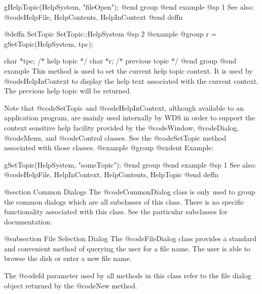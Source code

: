 gHelpTopic(HelpSystem, "fileOpen");
@end group
@end example
@sp 1
See also:  @code{HelpFile, HelpContents, HelpInContext}
@end deffn














@deffn {SetTopic} SetTopic::HelpSystem
@sp 2
@example
@group
r = gSetTopic(HelpSystem, tpc);

char    *tpc;   /*  help topic      */
char    *r;     /*  previous topic  */
@end group
@end example
This method is used to set the current help topic context.  It is
used by @code{HelpInContext} to display the help text associated
with the current context.  The previous help topic will be returned.

Note that @code{SetTopic} and @code{HelpInContext}, although available
to an application program, are mainly used internally by WDS in order to
support the context sensitive help facility provided by the @code{Window},
@code{Dialog}, @code{Menu}, and @code{Control} classes.  See the
@code{SetTopic} method associated with those classes.
@example
@group
@exdent Example:

gSetTopic(HelpSystem, "someTopic");
@end group
@end example
@sp 1
See also:  @code{HelpFile, HelpInContext, HelpContents, HelpTopic}
@end deffn










@section Common Dialogs
The @code{CommonDialog} class is only used to group the common dialogs
which are all subclasses of this class.  There is no specific
functionality associated with this class.  See the particular subclasses
for documentation.






@subsection File Selection Dialog
The @code{FileDialog} class provides a standard and convenient method of
querying the user for a file name.  The user is able to browse the disk
or enter a new file name.

The @code{fd} parameter used by all methods in this class refer to
the file dialog object returned by the @code{New} method.














